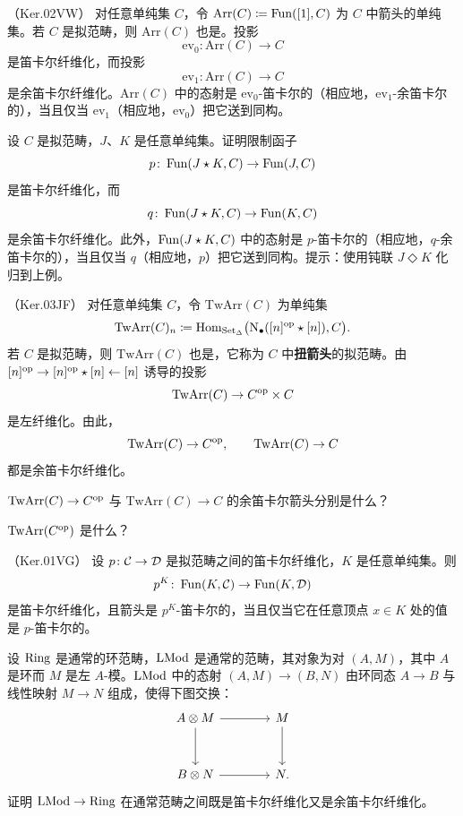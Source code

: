\begin{example}\label{L19-5.3}（Ker.02VW）
对任意单纯集 $C$，令 $\mathrm{Arr}(C)\coloneqq\operatorname{Fun}([1],C)$ 为 $C$ 中箭头的单纯集。若 $C$ 是拟范畴，则 $\mathrm{Arr}(C)$ 也是。投影
\[
\mathrm{ev}_0\colon\mathrm{Arr}(C)\to C
\]
是笛卡尔纤维化，而投影
\[
\mathrm{ev}_1\colon\mathrm{Arr}(C)\to C
\]
是余笛卡尔纤维化。$\mathrm{Arr}(C)$ 中的态射是 $\mathrm{ev}_0$-笛卡尔的（相应地，$\mathrm{ev}_1$-余笛卡尔的），当且仅当 $\mathrm{ev}_1$（相应地，$\mathrm{ev}_0$）把它送到同构。
\end{example}

\begin{exercise}\label{L19-5.4}
设 $C$ 是拟范畴，$J$、$K$ 是任意单纯集。证明限制函子
\[
p\colon\operatorname{Fun}(J\star K,C)\to\operatorname{Fun}(J,C)
\]
是笛卡尔纤维化，而
\[
q\colon\operatorname{Fun}(J\star K,C)\to\operatorname{Fun}(K,C)
\]
是余笛卡尔纤维化。此外，$\operatorname{Fun}(J\star K,C)$ 中的态射是 $p$-笛卡尔的（相应地，$q$-余笛卡尔的），当且仅当 $q$（相应地，$p$）把它送到同构。提示：使用钝联 $J\Diamond K$ 化归到上例。
\end{exercise}

\begin{example}\label{L19-5.5}（Ker.03JF）
对任意单纯集 $C$，令 $\mathrm{TwArr}(C)$ 为单纯集
\[
\mathrm{TwArr}(C)_n\coloneqq\operatorname{Hom}_{\operatorname{Set}_\Delta}\bigl(\mathrm{N}_{\bullet}([n]^{\mathrm{op}}\star[n]),C\bigr).
\]
若 $C$ 是拟范畴，则 $\mathrm{TwArr}(C)$ 也是，它称为 $C$ 中\textbf{扭箭头}的拟范畴。由 $[n]^{\mathrm{op}}\to[n]^{\mathrm{op}}\star[n]\leftarrow[n]$ 诱导的投影
\[
\mathrm{TwArr}(C)\to C^{\mathrm{op}}\times C
\]
是左纤维化。由此，
\[
\mathrm{TwArr}(C)\to C^{\mathrm{op}},\qquad \mathrm{TwArr}(C)\to C
\]
都是余笛卡尔纤维化。
\end{example}

\begin{exercise}\label{L19-5.6}
$\mathrm{TwArr}(C)\to C^{\mathrm{op}}$ 与 $\mathrm{TwArr}(C)\to C$ 的余笛卡尔箭头分别是什么？
\end{exercise}

\begin{exercise}\label{L19-5.7}
$\mathrm{TwArr}(C^{\mathrm{op}})$ 是什么？
\end{exercise}

\begin{example}\label{L19-5.8}（Ker.01VG）
设 $p\colon\mathcal{C}\to\mathcal{D}$ 是拟范畴之间的笛卡尔纤维化，$K$ 是任意单纯集。则
\[
p^{K}\colon\operatorname{Fun}(K,\mathcal{C})\to\operatorname{Fun}(K,\mathcal{D})
\]
是笛卡尔纤维化，且箭头是 $p^{K}$-笛卡尔的，当且仅当它在任意顶点 $x\in K$ 处的值是 $p$-笛卡尔的。
\end{example}

\begin{exercise}\label{L19-5.9}
设 $\operatorname{Ring}$ 是通常的环范畴，$\operatorname{LMod}$ 是通常的范畴，其对象为对 $(A,M)$，其中 $A$ 是环而 $M$ 是左 $A$-模。$\operatorname{LMod}$ 中的态射 $(A,M)\to(B,N)$ 由环同态 $A\to B$ 与线性映射 $M\to N$ 组成，使得下图交换：
\[
\begin{tikzcd}[column sep=4em,row sep=3em]
A\otimes M \arrow[r] \arrow[d] & M \arrow[d]\\
B\otimes N \arrow[r] & N.
\end{tikzcd}
\]
证明 $\operatorname{LMod}\to\operatorname{Ring}$ 在通常范畴之间既是笛卡尔纤维化又是余笛卡尔纤维化。
\end{exercise}

